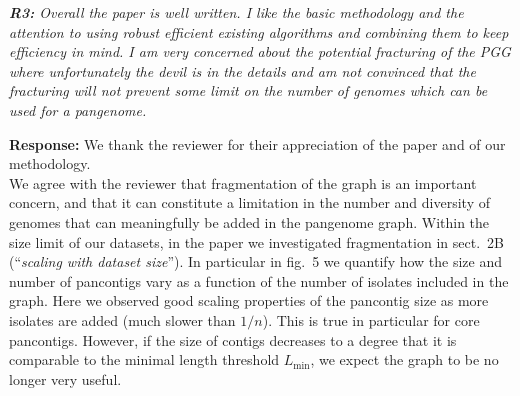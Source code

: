 \documentclass[aps,rmp,onecolumn]{revtex4-1}
\newcommand{\Lthr}{L_{\min}}
\newcommand{\Marco}[1]{{\color{orange}Marco: #1}}
\newcommand{\reviewer}[2]{{\it \textbf{#1:} #2\vskip 5mm}}
\newcommand{\response}[1]{{{\color{response}\textbf{Response:} #1}}\vskip 5mm}
\begin{document}
\reviewer{R3}{Overall the paper is well written. I like the basic methodology and the attention to using robust efficient existing algorithms and combining them to keep efficiency in mind. I am very concerned about the potential fracturing of the PGG where unfortunately the devil is in the details and am not convinced that the fracturing will not prevent some limit on the number of genomes which can be used for a pangenome.}
\response{
      We thank the reviewer for their appreciation of the paper and of our methodology.\\
      We agree with the reviewer that fragmentation of the graph is an important concern, and that it can constitute a limitation in the number and diversity of genomes that can meaningfully be added in the pangenome graph. 
      Within the size limit of our datasets, in the paper we investigated fragmentation in sect.~2B (``\textit{scaling with dataset size}''). 
      In particular in fig.~5 we quantify how the size and number of pancontigs vary as a function of the number of isolates included in the graph. 
      Here we observed good scaling properties of the pancontig size as more isolates are added (much slower than $1/n$).
      This is true in particular for core pancontigs. 
      However, if the size of contigs decreases to a degree that it is comparable to the minimal length threshold $\Lthr$, we expect the graph to be no longer very useful.     
      
}
\end{document}
